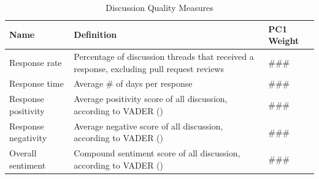 \begin{longtable}{>{\raggedright\arraybackslash}p{} p{}p{}}
\caption{Discussion Quality Measures}\label{tab:discussion_quality_metrics}\\
\toprule
\textbf{Name} & \textbf{Definition} & \textbf{PC1 Weight} \\
\midrule
\endfirsthead

\bottomrule
\endlastfoot

Response rate & Percentage of discussion threads that received a response, excluding pull request reviews & ### \\
Response time & Average \# of days per response & ###\\
Response positivity & Average positivity score of all discussion, according to VADER (\citealt{hutto_vader_2014}) & ###\\
Response negativity & Average negative score of all discussion, according to VADER (\citealt{hutto_vader_2014}) & ###\\
Overall sentiment & Compound sentiment score of all discussion, according to VADER (\citealt{hutto_vader_2014}) & ### \\
\bottomrule
\end{longtable}

